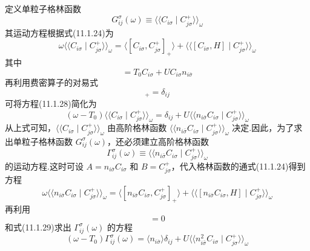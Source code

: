 定义单粒子格林函数
\begin{equation}
  G^{\sigma}_{ij}(\omega)\equiv
  \langle\langle C_{i\sigma}\mid C^{+}_{j\sigma}\rangle\rangle_{\omega}
\end{equation}
其运动方程根据式(11.1.24)为
\begin{equation}
  \omega\langle\langle C_{i\sigma}\mid C^{+}_{j\sigma}\rangle\rangle_{\omega}
  =\langle[C_{i\sigma},C^{+}_{j\sigma}]_{+}\rangle
  +\langle\langle[C_{i\sigma},H]\mid C^{+}_{j\sigma}\rangle\rangle_{\omega}
\end{equation}
其中
\begin{equation}
  [C_{i\sigma},H]=T_{0}C_{i\sigma}+UC_{i\sigma}n_{i\bar{\sigma}}
\end{equation}
再利用费密算子的对易式
\begin{equation}
  [C_{i\sigma},C^{+}_{j\sigma}]_{+}=\delta_{ij}
\end{equation}
可将方程(11.1.28)简化为
\begin{equation}
  (\omega-T_{0})\langle\langle C_{i\sigma}\mid C^{+}_{j\sigma}\rangle\rangle_{\omega}
  =\delta_{ij}
  +U\langle\langle n_{i\bar{\sigma}}C_{i\sigma}\mid C^{+}_{j\sigma}\rangle\rangle_{\omega}
\end{equation}
从上式可知，$\langle\langle C_{i\sigma}\mid C^{+}_{j\sigma}\rangle\rangle_{\omega}$ 由高阶格林函数 $\langle\langle n_{i\bar{\sigma}}C_{i\sigma}\mid C^{+}_{j\sigma}\rangle\rangle_{\omega}$ 决定.因此，为了求出单粒子格林函数 $G^{\sigma}_{ij}(\omega)$，还必须建立高阶格林函数
\begin{equation}
  \Gamma^{\sigma}_{ij}(\omega)\equiv
  \langle\langle n_{i\bar{\sigma}}C_{i\sigma}\mid C^{+}_{j\sigma}\rangle\rangle_{\omega}
\end{equation}
的运动方程.这时可设 $A=n_{i\bar{\sigma}}C_{i\sigma}$ 和 $B=C^{+}_{j\sigma}$，代入格林函数的通式(11.1.24)得到方程
\begin{equation}
  \omega\langle\langle n_{i\bar{\sigma}}C_{i\sigma}\mid C^{+}_{j\sigma}\rangle\rangle_{\omega}
  =\langle[n_{i\bar{\sigma}}C_{i\sigma},C^{+}_{j\sigma}]_{+}\rangle
  +\langle\langle[n_{i\bar{\sigma}}C_{i\sigma},H]\mid C^{+}_{j\sigma}\rangle\rangle_{\omega}
\end{equation}
再利用
\begin{equation*}
  [n_{i\bar{\sigma}},H]=0
\end{equation*}
和式(11.1.29)求出 $\Gamma^{\sigma}_{ij}(\omega)$ 的方程
\begin{equation}
  (\omega-T_{0})\Gamma^{\sigma}_{ij}(\omega)
  =\langle n_{i\bar{\sigma}}\rangle\delta_{ij}
  +U\langle\langle n^{2}_{i\bar{\sigma}}C_{i\sigma}\mid C^{+}_{j\sigma}\rangle\rangle_{\omega}
\end{equation}
